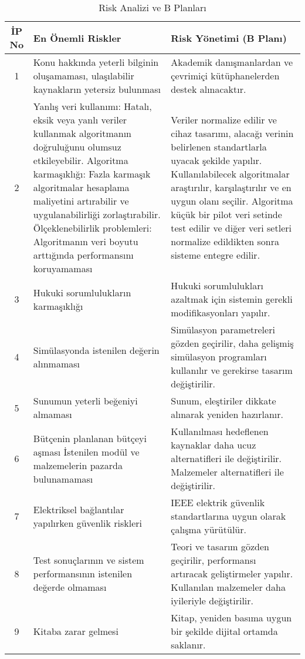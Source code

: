 \begin{table}[h!]
\captionsetup{justification=raggedright, singlelinecheck=false}
\centering
\caption{Risk Analizi ve B Planları} \label{tabel:riskanalizi}
\begin{tabular}{|c|p{6cm}|p{7cm}|}
\hline
\textbf{İP No} & \textbf{En Önemli Riskler} & \textbf{Risk Yönetimi (B Planı)} \\
\hline
1 & Konu hakkında yeterli bilginin oluşamaması, ulaşılabilir kaynakların yetersiz bulunması & Akademik danışmanlardan ve çevrimiçi kütüphanelerden destek alınacaktır. \\
\hline
2 & Yanlış veri kullanımı: Hatalı, eksik veya yanlı veriler kullanmak algoritmanın doğruluğunu olumsuz etkileyebilir.  \newline Algoritma karmaşıklığı: Fazla karmaşık algoritmalar hesaplama maliyetini artırabilir ve uygulanabilirliği zorlaştırabilir. \newline Ölçeklenebilirlik problemleri: Algoritmanın veri boyutu arttığında performansını koruyamaması & Veriler normalize edilir ve cihaz tasarımı, alacağı verinin belirlenen standartlarla uyacak şekilde yapılır. \newline Kullanılabilecek algoritmalar araştırılır, karşılaştırılır ve en uygun olanı seçilir. \newline Algoritma küçük bir pilot veri setinde test edilir ve diğer veri setleri normalize edildikten sonra sisteme entegre edilir. \\
\hline
3 & Hukuki sorumlulukların karmaşıklığı & Hukuki sorumlulukları azaltmak için sistemin gerekli modifikasyonları yapılır. \\
\hline
4 & Simülasyonda istenilen değerin alınmaması & Simülasyon parametreleri gözden geçirilir, daha gelişmiş simülasyon programları kullanılır ve gerekirse tasarım değiştirilir. \\
\hline
5 & Sunumun yeterli beğeniyi almaması & Sunum, eleştiriler dikkate alınarak yeniden hazırlanır. \\
\hline
6 & Bütçenin planlanan bütçeyi aşması \newline İstenilen modül ve malzemelerin pazarda bulunamaması & Kullanılması hedeflenen kaynaklar daha ucuz alternatifleri ile değiştirilir. \newline Malzemeler alternatifleri ile değiştirilir. \\
\hline
7 & Elektriksel bağlantılar yapılırken güvenlik riskleri & IEEE elektrik güvenlik standartlarına uygun olarak çalışma yürütülür. \\
\hline
8 & Test sonuçlarının ve sistem performansının istenilen değerde olmaması & Teori ve tasarım gözden geçirilir, performansı artıracak geliştirmeler yapılır. Kullanılan malzemeler daha iyileriyle değiştirilir. \\
\hline
9 & Kitaba zarar gelmesi & Kitap, yeniden basıma uygun bir şekilde dijital ortamda saklanır. \\
\hline
\end{tabular}
\end{table}


